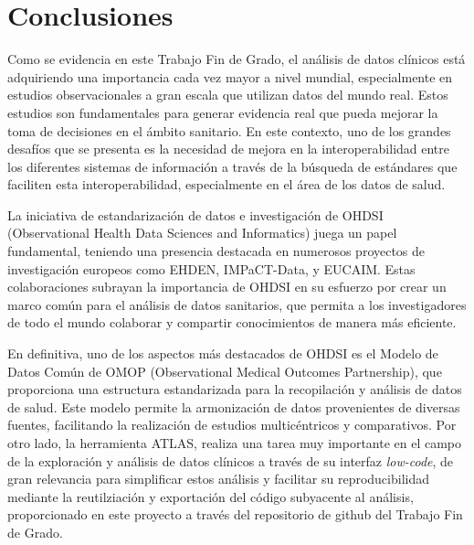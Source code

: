 \chapter{Conclusiones}\label{cap:11conclusiones}

Como se evidencia en este Trabajo Fin de Grado, el análisis de datos clínicos está adquiriendo una importancia cada vez mayor a nivel mundial, especialmente en estudios observacionales a gran escala que utilizan datos del mundo real. Estos estudios son fundamentales para generar evidencia real que pueda mejorar la toma de decisiones en el ámbito sanitario. En este contexto, uno de los grandes desafíos que se presenta es la necesidad de mejora en la interoperabilidad entre los diferentes sistemas de información a través de la búsqueda de estándares que faciliten esta interoperabilidad, especialmente en el área de los datos de salud.

La iniciativa de estandarización de datos e investigación de OHDSI (Observational Health Data Sciences and Informatics) juega un papel fundamental, teniendo una presencia destacada en numerosos proyectos de investigación europeos como EHDEN, IMPaCT-Data, y EUCAIM. Estas colaboraciones subrayan la importancia de OHDSI en su esfuerzo por crear un marco común para el análisis de datos sanitarios, que permita a los investigadores de todo el mundo colaborar y compartir conocimientos de manera más eficiente.

En definitiva, uno de los aspectos más destacados de OHDSI es el Modelo de Datos Común de OMOP (Observational Medical Outcomes Partnership), que proporciona una estructura estandarizada para la recopilación y análisis de datos de salud. Este modelo permite la armonización de datos provenientes de diversas fuentes, facilitando la realización de estudios multicéntricos y comparativos. %
Por otro lado, la herramienta ATLAS, realiza una tarea muy importante en el campo de la exploración y análisis de datos clínicos a través de su interfaz \textit{low-code}, de gran relevancia para simplificar estos análisis y facilitar su reproducibilidad mediante la reutilziación y exportación del código subyacente al análisis, proporcionado en este proyecto a través del repositorio de github del Trabajo Fin de Grado.


